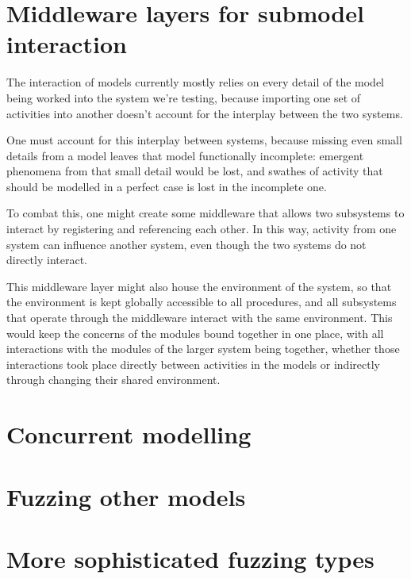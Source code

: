 \section{Middleware layers for submodel interaction}
\label{middleware-layers}
The interaction of models currently mostly relies on every detail of the model being worked into the system we're testing, because importing one set of activities into another doesn't account for the interplay between the two systems. \par
One must account for this interplay between systems, because missing even small details from a model leaves that model functionally incomplete: emergent phenomena from that small detail would be lost, and swathes of activity that should be modelled in a perfect case is lost in the incomplete one. \par
To combat this, one might create some middleware that allows two subsystems to interact by registering and referencing each other. In this way, activity from one system can influence another system, even though the two systems do not directly interact. \par
This middleware layer might also house the environment of the system, so that the environment is kept globally accessible to all procedures, and all subsystems that operate through the middleware interact with the same environment. This would keep the concerns of the modules bound together in one place, with all interactions with the modules of the larger system being together, whether those interactions took place directly between activities in the models or indirectly through changing their shared environment.

\section{Concurrent modelling}
\label{concurrent_modelling}

\section{Fuzzing other models}
\label{fuzzing_other_models}


\section{More sophisticated fuzzing types}
\label{more_advanced_fuzzing}

